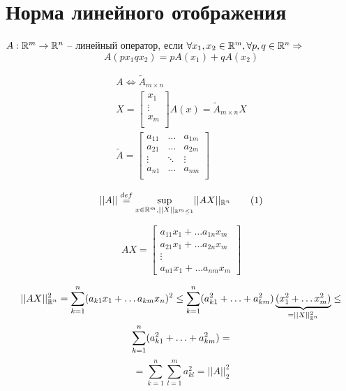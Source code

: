 \documentclass[main]{subfiles}
\begin{document}
\chapter{Норма линейного отображения}
\begin{definition}
    $A: {\mathbb{R}}^m \rightarrow {\mathbb{R}}^n$ -- линейный оператор, если
    $ \forall x_1, x_2 \in {\mathbb{R}}^m, \forall p, q \in {\mathbb{R}}^n \Rightarrow$
    \[A(px_1 qx_2) = pA(x_1) + qA(x_2)\]
\end{definition}
\begin{gather*}
    A \Leftrightarrow \tilde{A}_{m \times n} \\
    X =
        \begin{bmatrix}
            x_1 \\
            \vdots \\
            x_m  \\
        \end{bmatrix}
    A(x) = \tilde{A}_{m \times n} X \\
    \tilde{A} = 
    \begin{bmatrix}
        a_{11} & \ldots & a_{1m} \\
        a_{21} & \ldots & a_{2m} \\
        \vdots & \ddots & \vdots \\
        a_{n1} & \ldots & a_{nm} \\
    \end{bmatrix}
\end{gather*}

\begin{definition}
    \[||A|| \stackrel{def}{=} \underset{x \in {\mathbb{R}}^m, ||X||_{{\mathbb{R}}^m \leq 1}}{\sup}
     {||AX||_{{\mathbb{R}}^n}} \tag{1} \]
\end{definition}


\[AX = \begin{bmatrix}
    a_{11}x_1 + \ldots a_{1n}x_m \\
    a_{21}x_1 + \ldots a_{2n}x_m \\
    \vdots \\
    a_{n1}x_1 + \ldots a_{nm}x_m
\end{bmatrix}\]



\begin{multline*}
    ||AX||^2_{{\mathbb{R}}^n} = \sum_{k=1}^n(a_{k1}x_1 + \ldots a_{km}x_n)^2 \leq 
    \sum_{k=1}^n (a^2_{k1} + \ldots + a^2_{km})\underbrace{(x_1^2 + \ldots x_m^2)}_{=||X||^2_{{\mathbb{R}}^n}} \leq \\
    \sum_{k=1}^n (a^2_{k1} + \ldots + a^2_{km}) =
\end{multline*}
     \[=\sum_{k=1}^n \sum_{l=1}^m a_{kl}^2 =||A||_2^2  \tag{2}\]
\end{document}
